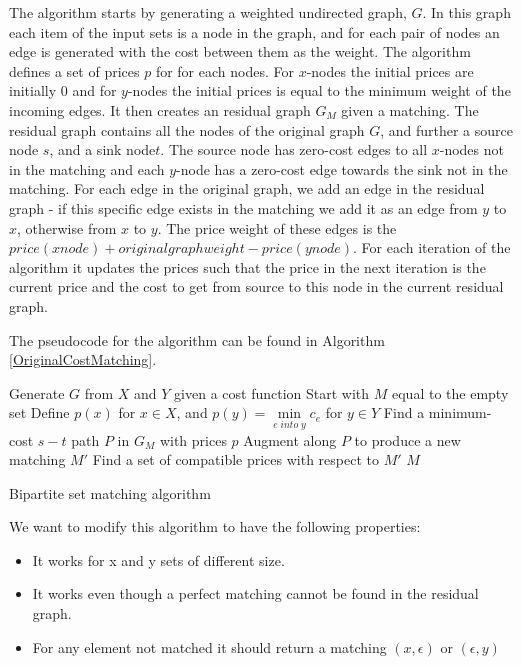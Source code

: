 \documentclass[11pt]{article}
\begin{document}
The \citet{bipartitecost} algorithm starts by generating a weighted undirected graph, $G$. In this graph each item of the input sets is a node in the graph, and for each pair of nodes an edge is generated with the cost between them as the weight. The algorithm defines a set of prices $p$ for for each nodes. For $x$-nodes the initial prices are initially 0 and for $y$-nodes the initial prices is equal to the minimum weight of the incoming edges. It then creates an residual graph $G_M$ given a matching. The residual graph contains all the nodes of the original graph $G$, and further a source node $s$, and a sink node$t$. The source node has zero-cost edges to all $x$-nodes not in the matching and each $y$-node has a zero-cost edge towards the sink not in the matching. For each edge in the original graph, we add an edge in the residual graph - if this specific edge exists in the matching we add it as an edge from $y$ to $x$, otherwise from $x$ to $y$. The price weight of these edges is the $price(xnode)+originalgraphweight-price(ynode)$. For each iteration of the algorithm it updates the prices such that the price in the next iteration is the current price and the cost to get from source to this node in the current residual graph.

The pseudocode for the algorithm can be found in Algorithm \ref{OriginalCostMatching}.


\begin{algorithm}
\begin{algorithmic}
	\State Generate $G$ from $X$ and $Y$ given a cost function
	\State Start with $M$ equal to the empty set
	\State Define $p(x)$ for $x \in X$, and  $p(y) = \underset{e \; into \; y}{\operatorname{min}} c_e$ for $y \in Y$
    	\State Find a minimum-cost $s-t$ path $P$ in $G_M$ with prices $p$
    	\State Augment along $P$ to produce a new matching $M'$
    	\State Find a set of compatible prices with respect to $M'$
    \EndWhile
	\State \Return $M$
\EndFunction
\end{algorithmic}
	\caption{Bipartite set matching algorithm}
	\label{OriginalCostMatching}
\end{algorithm}

We want to modify this algorithm to have the following properties:

\begin{itemize}
\item It works for x and y sets of different size. 
\item It works even though a perfect matching cannot be found in the residual graph.
\item For any element not matched it should return a matching $(x, \epsilon)$ or $(\epsilon, y)$
\end{itemize}
\end{document}

